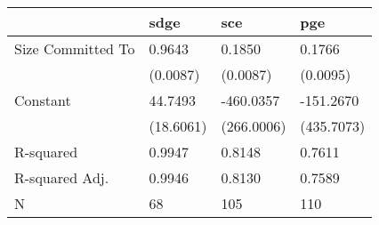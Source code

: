\begin{tabular}{llll}
\hline
                  & sdge      & sce        & pge         \\
\hline
Size Committed To & 0.9643    & 0.1850     & 0.1766      \\
                  & (0.0087)  & (0.0087)   & (0.0095)    \\
Constant          & 44.7493   & -460.0357  & -151.2670   \\
                  & (18.6061) & (266.0006) & (435.7073)  \\
R-squared         & 0.9947    & 0.8148     & 0.7611      \\
R-squared Adj.    & 0.9946    & 0.8130     & 0.7589      \\
N                 & 68        & 105        & 110         \\
\hline
\end{tabular}